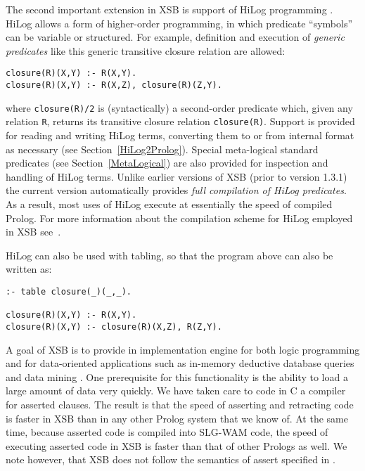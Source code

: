 The second important extension in XSB is support of HiLog
programming \cite{ChKW93,SaWa95}.  HiLog allows a form of 
higher-order programming, in
which predicate ``symbols'' can be variable or structured.  For example,
definition and execution of {\em generic predicates} like this generic
transitive closure relation are allowed:
\begin{center}
\begin{minipage}{3.7in}
\begin{verbatim}
closure(R)(X,Y) :- R(X,Y).
closure(R)(X,Y) :- R(X,Z), closure(R)(Z,Y).
\end{verbatim}
\end{minipage}
\end{center}
where {\tt closure(R)/2} is (syntactically) a second-order predicate
which, given any relation {\tt R}, returns its transitive closure
relation {\tt closure(R)}.  Support is provided for reading and
writing HiLog terms, converting them to or from internal format as
necessary (see Section~\ref{HiLog2Prolog}).  Special meta-logical
standard predicates (see Section~\ref{MetaLogical}) are also provided
for inspection and handling of HiLog terms.  Unlike earlier versions
of XSB (prior to version 1.3.1) the current version automatically
provides {\em full compilation of HiLog predicates}.  As a result,
most uses of HiLog execute at essentially the speed of compiled
Prolog.  For more information about the compilation scheme for HiLog
employed in XSB see~\cite{SaWa95}.

HiLog can also be used with tabling, so that the program above can also be
written as:
\begin{center}
\begin{minipage}{3.7in}
\begin{verbatim}
:- table closure(_)(_,_).

closure(R)(X,Y) :- R(X,Y).
closure(R)(X,Y) :- closure(R)(X,Z), R(Z,Y).
\end{verbatim}
\end{minipage}
\end{center}

A goal of XSB is to provide in implementation engine for both logic
programming and for data-oriented applications such as in-memory
deductive database queries and data mining \cite{SaSw94}.  One
prerequisite for this functionality is the ability to load a large
amount of data very quickly.  We have taken care to code in C a
compiler for asserted clauses.  The result is that the speed of
asserting and retracting code is faster in XSB than in any
other Prolog system that we know of.  At the same time, because
asserted code is compiled into SLG-WAM code, the speed of executing
asserted code in XSB is faster than that of other Prologs as
well.  We note however, that XSB does not follow the semantics
of assert specified in \cite{LiOk87}.

